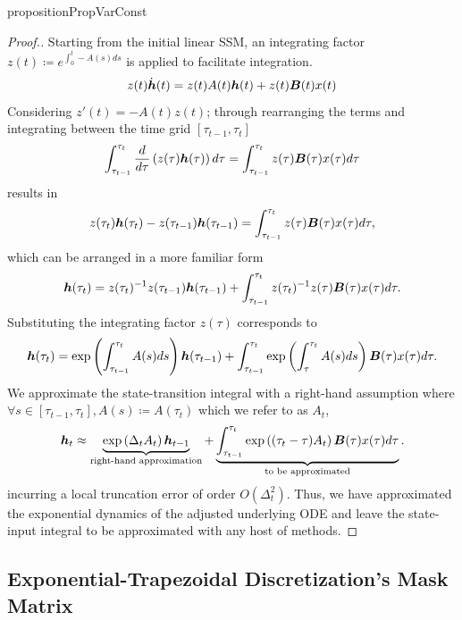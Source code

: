\begin{restatable}{proposition}{PropVarConst}
\end{restatable} \begin{proof}[Proof.]
Starting from the initial linear SSM, an integrating factor $z(t) \coloneqq e^{\int^t_0 -A(s)ds}$ is applied to facilitate integration.
\[
    z(t) \dot{{\bm{h}}}(t) = z(t)A(t){\bm{h}}(t) +z(t){\bm{B}}(t)x(t)
\]
Considering $z'(t) = -A(t)z(t)$; through rearranging the terms and integrating between the time grid $[\tau_{t-1},\tau_t]$
\[
    \int_{\tau_{t-1}}^{\tau_t} \frac{d}{d\tau}\left( z(\tau) {\bm{h}}(\tau) \right) d\tau = \int_{\tau_{t-1}}^{\tau_t} z(\tau) {\bm{B}}(\tau)x(\tau) d\tau
\]
results in
\[
    z(\tau_t){\bm{h}}(\tau_t) - z(\tau_{t-1}){\bm{h}}(\tau_{t-1}) = \int_{\tau_{t-1}}^{\tau_t} z(\tau){\bm{B}}(\tau)x(\tau) d\tau,
\]
which can be arranged in a more familiar form
\[
    {\bm{h}}(\tau_t) = z(\tau_t)^{-1}z(\tau_{t-1}){\bm{h}}(\tau_{t-1}) + \int_{\tau_{t-1}}^{\tau_t} z(\tau_t)^{-1}z(\tau){\bm{B}}(\tau)x(\tau) d\tau.
\]
Substituting the integrating factor $z(\tau)$ corresponds to
\[
    {\bm{h}}(\tau_t) = \exp\left(\int_{\tau_{t-1}}^{\tau_t}A(s)ds\right){\bm{h}}(\tau_{t-1}) + \int_{\tau_{t-1}}^{\tau_t} \exp\left(\int_{\tau}^{\tau_t}A(s)ds\right){\bm{B}}(\tau)x(\tau) d\tau.
\]
We approximate the state-transition integral with a right-hand assumption where $\forall s \in [\tau_{t-1},\tau_t], A(s) \coloneqq A(\tau_t)$ which we refer to as $A_t$,
\[
    {\bm{h}}_t \approx \underbrace{\exp\left(\Delta_t A_t\right){\bm{h}}_{t-1}}_\text{right-hand approximation} + \underbrace{\int_{\tau_{t-1}}^{\tau_t} \exp\left((\tau_t -\tau)A_t\right){\bm{B}}(\tau)x(\tau) d\tau}_\text{to be approximated}.
\]
incurring a local truncation error of order $O(\Delta_t^2)$.
Thus, we have approximated the exponential dynamics of the adjusted underlying ODE and leave the state-input integral to be approximated with any host of methods.
\end{proof}

\subsection{Exponential-Trapezoidal Discretization's Mask Matrix}
\label{app:proof-tensor}

